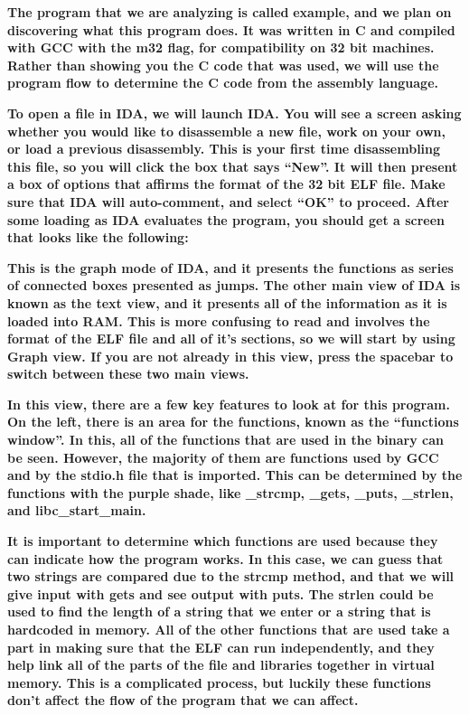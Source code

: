 \documentclass[letterpaper]{article}
\newcommand{\sitfig}[3]{
\begin{figure}[H]
\centering
\makebox[\textwidth][c]{
#2
}
\label{#1}
\end{figure}
}
\newcommand{\sitgfx}[4][scale=1.0]{
\sitfig{#3}{\texttt{[image: \#2]}}{#4}
}
\begin{document}
\textbf{The program that we are analyzing is called
}\textbf{\textcolor[rgb]{0.21960784,0.4627451,0.11372549}{example}}\textbf{, and we plan on discovering what this
program does. It was written in C and compiled with GCC with the m32 flag, for compatibility on 32 bit machines. Rather
than showing you the C code that was used, we will use the program flow to determine the C code from the assembly
language.}

\textbf{To open a file in IDA, we will launch IDA. You will see a screen asking whether you would like to disassemble a
new file, work on your own, or load a previous disassembly. This is your first time disassembling this file, so you
will click the box that says ``New''. It will then present a box of options that affirms the format of the 32 bit ELF
file. Make sure that IDA will auto-comment, and select ``OK'' to proceed. After some loading as IDA evaluates the
program, you should get a screen that looks like the following:}

  
\sitgfx[width=6.5in,height=4.0626in]{FINALWORKINGDOCFORMERLYPRECURSOR-img045.png}{fig:unk}{TODO CAPTION}
 \textbf{This is the graph mode of IDA, and it presents the functions as series of connected boxes presented as jumps.
The other main view of IDA is known as the text view, and it presents all of the information as it is loaded into RAM.
This is more confusing to read and involves the format of the ELF file and all of it's sections, so we will start by
using Graph view. If you are not already in this view, press the spacebar to switch between these two main views.}

\textbf{In this view, there are a few key features to look at for this program. On the left, there is an area for the
functions, known as the ``functions window''. In this, all of the functions that are used in the binary can be seen.
However, the majority of them are functions used by GCC and by the stdio.h file that is imported. This can be
determined by the functions with the purple shade, like \_strcmp, \_gets, \_puts, \_strlen, and libc\_start\_main.}

\textbf{It is important to determine which functions are used because they can indicate how the program works. In this
case, we can guess that two strings are compared due to the strcmp method, and that we will give input with gets and
see output with puts. The strlen could be used to find the length of a string that we enter or a string that is
hardcoded in memory. All of the other functions that are used take a part in making sure that the ELF can run
independently, and they help link all of the parts of the file and libraries together in virtual memory. This is a
complicated process, but luckily these functions don't affect the flow of the program that we can affect.}
\end{document}
